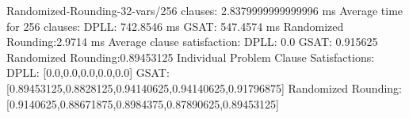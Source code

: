 \documentclass{article}
\begin{document}
Randomized-Rounding-32-vars/256 clauses: 2.8379999999999996 ms\newline
Average time for 256 clauses:\newline
  DPLL:               742.8546 ms\newline
  GSAT:               547.4574 ms\newline
  Randomized Rounding:2.9714 ms\newline
Average clause satisfaction:\newline
  DPLL:               0.0\newline
  GSAT:               0.915625\newline
  Randomized Rounding:0.89453125\newline
\newline
Individual Problem Clause Satisfactions:\newline
  DPLL:               [0.0,0.0,0.0,0.0,0.0]\newline
  GSAT:               [0.89453125,0.8828125,0.94140625,0.94140625,0.91796875]\newline
  Randomized Rounding:[0.9140625,0.88671875,0.8984375,0.87890625,0.89453125]\newline
\end{document}
